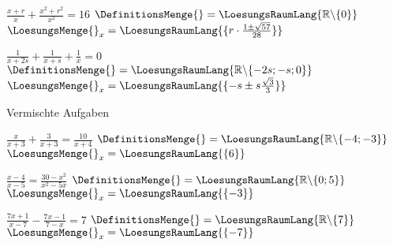 \begin{bbwAufgabenBlock}
\item $\frac{x+r}x + \frac{x^2+r^2}{x^2} = 16$ \hspace{10mm}         $\DefinitionsMenge{}= \LoesungsRaumLang{\mathbb{R}\backslash\{0\}}$          $\LoesungsMenge{}_x = \LoesungsRaumLang{\{r\cdot{}\frac{1\pm\sqrt{57}}{28} \}}$
\item $\frac1{x+2s}+ \frac1{x+s} + \frac1{x}=0$ \hspace{10mm}
$\DefinitionsMenge{}= \LoesungsRaumLang{\mathbb{R}\backslash\{-2s;-s;0\}}$
$\LoesungsMenge{}_x = \LoesungsRaumLang{\{-s\pm s\frac{\sqrt{3}}{3} \}}$

\end{bbwAufgabenBlock}

\platzFuerBerechnungenBisEndeSeite{}




Vermischte Aufgaben


\begin{bbwAufgabenBlock}
\item $\frac{x}{x+3} + \frac{3}{x+3} = \frac{10}{x+4}$ \hspace{10mm}
$\DefinitionsMenge{}= \LoesungsRaumLang{\mathbb{R}\backslash\{-4;-3\}}$
$\LoesungsMenge{}_x = \LoesungsRaumLang{\{  6  \}}$
\item $\frac{x-4}{x-5}  = \frac{30-x^2}{x^2-5x}$ \hspace{10mm}
$\DefinitionsMenge{}= \LoesungsRaumLang{\mathbb{R}\backslash\{0;5 \}}$
$\LoesungsMenge{}_x = \LoesungsRaumLang{\{  -3  \}}$
\item $\frac{7x+1}{x-7}   - \frac{7x-1}{7-x} = 7$ \hspace{10mm}
$\DefinitionsMenge{}= \LoesungsRaumLang{\mathbb{R}\backslash\{7 \}}$
$\LoesungsMenge{}_x = \LoesungsRaumLang{\{  -7  \}}$

\end{bbwAufgabenBlock}

\platzFuerBerechnungenBisEndeSeite{}





